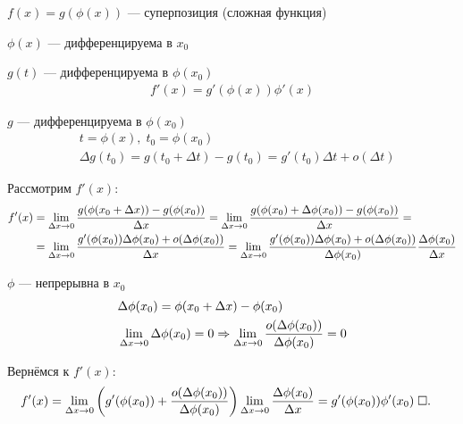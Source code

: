 \documentclass{article}
\begin{document}
\pagebreak

\theorem

$f(x) = g(\phi(x))$ --- суперпозиция (сложная функция)

$\phi (x)$ --- дифференцируема в $x_0$

$g(t)$ --- дифференцируема в $\phi (x_0)$
\begin{align*}
	f'(x)=g'(\phi(x))\phi'(x)
\end{align*}

\proof

$g$ --- дифференцируема в $\phi(x_0)$
\begin{align*}
	 & t=\phi(x),\;t_0=\phi(x_0)                                               \\
	 & \Delta g(t_0) = g(t_0 + \Delta t) - g(t_0) =g'(t_0)\Delta t+o(\Delta t)
\end{align*}

Рассмотрим $f'(x)$:
\begin{align*}
	f'(x) & =\lim\limits_{\Delta x\to 0}\frac{g(\phi(x_0+\Delta x))-g(\phi(x_0))}{\Delta x}=\lim\limits_{\Delta x\to 0}\frac{g(\phi(x_0)+\Delta \phi(x_0))-g(\phi(x_0))}{\Delta x}= \\
	      & =\lim\limits_{\Delta x\to 0}\frac{g'(\phi(x_0))\Delta \phi(x_0)+o(\Delta\phi(x_0))}{\Delta x}
	=\lim\limits_{\Delta x\to 0}\frac{g'(\phi(x_0))\Delta \phi(x_0)+o(\Delta\phi(x_0))}{\Delta \phi(x_0)}\frac{\Delta\phi(x_0)}{\Delta x}
\end{align*}

$\phi$ --- непрерывна в $x_0$
\begin{align*}
	 & \Delta \phi(x_0)=\phi(x_0+\Delta x)-\phi(x_0)                                                               \\
	 & \lim\limits_{\Delta x\to 0}\Delta\phi(x_0)=0\Rightarrow \lim\limits_{\Delta x\to 0}\frac{o(\Delta\phi(x_0))}{\Delta\phi(x_0)}=0
\end{align*}

Вернёмся к $f'(x)$:
\begin{align*}
	f'(x) & =\lim\limits_{\Delta x\to 0}\left(g'(\phi(x_0))+\frac{o(\Delta\phi(x_0))}{\Delta \phi(x_0)}\right)\lim\limits_{\Delta x\to 0}\frac{\Delta\phi(x_0)}{\Delta x}=g'(\phi(x_0))\phi'(x_0)\;\square.
\end{align*}
\end{document}
